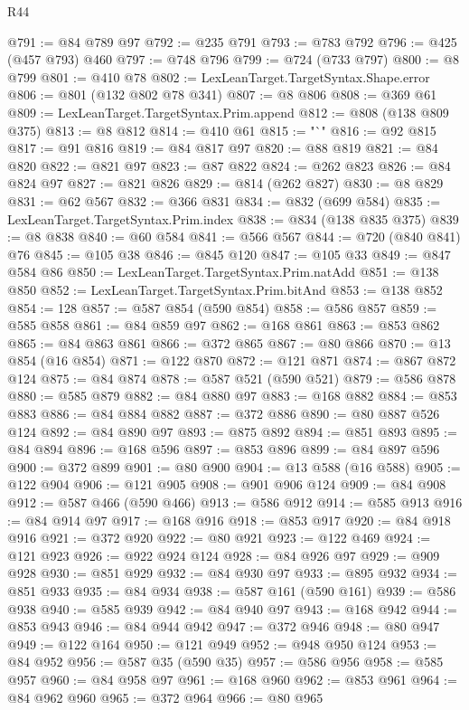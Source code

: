 \begin{lexlean}{R44}
\begin{coremodule}
@791 := @84 @789 @97
@792 := @235 @791
@793 := @783 @792
@796 := @425 (@457 @793) @460
@797 := @748 @796
@799 := @724 (@733 @797)
@800 := @8 @799
@801 := @410 @78
@802 := LexLeanTarget.TargetSyntax.Shape.error
@806 := @801 (@132 @802 @78 @341)
@807 := @8 @806
@808 := @369 @61
@809 := LexLeanTarget.TargetSyntax.Prim.append
@812 := @808 (@138 @809 @375)
@813 := @8 @812
@814 := @410 @61
@815 := "`"
@816 := @92 @815
@817 := @91 @816
@819 := @84 @817 @97
@820 := @88 @819
@821 := @84 @820
@822 := @821 @97
@823 := @87 @822
@824 := @262 @823
@826 := @84 @824 @97
@827 := @821 @826
@829 := @814 (@262 @827)
@830 := @8 @829
@831 := @62 @567
@832 := @366 @831
@834 := @832 (@699 @584)
@835 := LexLeanTarget.TargetSyntax.Prim.index
@838 := @834 (@138 @835 @375)
@839 := @8 @838
@840 := @60 @584
@841 := @566 @567
@844 := @720 (@840 @841) @76
@845 := @105 @38
@846 := @845 @120
@847 := @105 @33
@849 := @847 @584 @86
@850 := LexLeanTarget.TargetSyntax.Prim.natAdd
@851 := @138 @850
@852 := LexLeanTarget.TargetSyntax.Prim.bitAnd
@853 := @138 @852
@854 := 128
@857 := @587 @854 (@590 @854)
@858 := @586 @857
@859 := @585 @858
@861 := @84 @859 @97
@862 := @168 @861
@863 := @853 @862
@865 := @84 @863 @861
@866 := @372 @865
@867 := @80 @866
@870 := @13 @854 (@16 @854)
@871 := @122 @870
@872 := @121 @871
@874 := @867 @872 @124
@875 := @84 @874
@878 := @587 @521 (@590 @521)
@879 := @586 @878
@880 := @585 @879
@882 := @84 @880 @97
@883 := @168 @882
@884 := @853 @883
@886 := @84 @884 @882
@887 := @372 @886
@890 := @80 @887 @526 @124
@892 := @84 @890 @97
@893 := @875 @892
@894 := @851 @893
@895 := @84 @894
@896 := @168 @596
@897 := @853 @896
@899 := @84 @897 @596
@900 := @372 @899
@901 := @80 @900
@904 := @13 @588 (@16 @588)
@905 := @122 @904
@906 := @121 @905
@908 := @901 @906 @124
@909 := @84 @908
@912 := @587 @466 (@590 @466)
@913 := @586 @912
@914 := @585 @913
@916 := @84 @914 @97
@917 := @168 @916
@918 := @853 @917
@920 := @84 @918 @916
@921 := @372 @920
@922 := @80 @921
@923 := @122 @469
@924 := @121 @923
@926 := @922 @924 @124
@928 := @84 @926 @97
@929 := @909 @928
@930 := @851 @929
@932 := @84 @930 @97
@933 := @895 @932
@934 := @851 @933
@935 := @84 @934
@938 := @587 @161 (@590 @161)
@939 := @586 @938
@940 := @585 @939
@942 := @84 @940 @97
@943 := @168 @942
@944 := @853 @943
@946 := @84 @944 @942
@947 := @372 @946
@948 := @80 @947
@949 := @122 @164
@950 := @121 @949
@952 := @948 @950 @124
@953 := @84 @952
@956 := @587 @35 (@590 @35)
@957 := @586 @956
@958 := @585 @957
@960 := @84 @958 @97
@961 := @168 @960
@962 := @853 @961
@964 := @84 @962 @960
@965 := @372 @964
@966 := @80 @965

\end{coremodule}
\end{lexlean}
